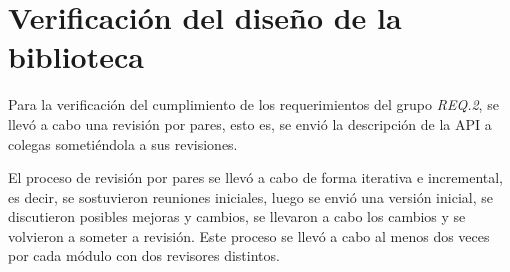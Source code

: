 \section{Verificación del diseño de la biblioteca}

Para la verificación del cumplimiento de los requerimientos del grupo \emph{REQ.2}, se llevó a cabo una revisión por pares, esto es, se envió la descripción de la API a colegas sometiéndola a sus revisiones. 

El proceso de revisión por pares se llevó a cabo de forma iterativa e incremental, es decir, se sostuvieron reuniones iniciales, luego se envió una versión inicial, se discutieron posibles mejoras y cambios, se llevaron a cabo los cambios y se volvieron a someter a revisión. Este proceso se llevó a cabo al menos dos veces por cada módulo con dos revisores distintos.
